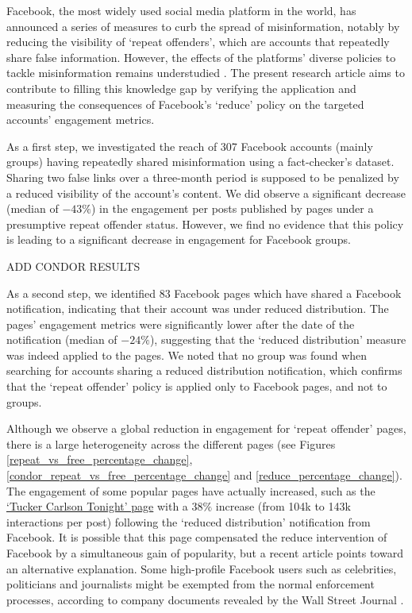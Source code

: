 \documentclass[review]{elsarticle}
\begin{document}
{Facebook, the most widely used social media platform in the world, has announced a series of measures to curb the spread of misinformation, notably by reducing the visibility of `repeat offenders', which are accounts that repeatedly share false information. 
However, the effects of the platforms' diverse policies to tackle misinformation remains understudied \citep{pasquetto2020tackling}. 
The present research article aims to contribute to filling this knowledge gap by verifying the application and measuring the consequences of Facebook's `reduce' policy on the targeted accounts' engagement metrics.

As a first step, we investigated the reach of 307 Facebook accounts (mainly groups) having repeatedly shared misinformation using a fact-checker's dataset. 
Sharing two false links over a three-month period is supposed to be penalized by a reduced visibility of the account's content. 
We did observe a significant decrease (median of $-43\%$) in the engagement per posts published by pages under a presumptive repeat offender status.
However, we find no evidence that this policy is leading to a significant decrease in engagement for Facebook groups.

{\color{red} ADD CONDOR RESULTS}
 
As a second step, we identified 83 Facebook pages which have shared a Facebook notification, indicating that their account was under reduced distribution.
The pages' engagement metrics were significantly lower after the date of the notification (median of $-24\%$), suggesting that the `reduced distribution' measure was indeed applied to the pages.
We noted that no group was found when searching for accounts sharing a reduced distribution notification, which confirms that the `repeat offender' policy is applied only to Facebook pages, and not to groups.

Although we observe a global reduction in engagement for `repeat offender' pages, there is a large heterogeneity across the different pages (see Figures \ref{repeat_vs_free_percentage_change}, \ref{condor_repeat_vs_free_percentage_change} and \ref{reduce_percentage_change}). 
The engagement of some popular pages have actually increased, such as the \href{https://www.facebook.com/TuckerCarlsonTonight/}{`Tucker Carlson Tonight' page} with a $38\%$ increase (from 104k to 143k interactions per post)  following the `reduced distribution' notification from Facebook. 
It is possible that this page compensated the reduce intervention of Facebook by a simultaneous gain of popularity, but a recent article points toward an alternative explanation. 
Some high-profile Facebook users such as celebrities, politicians and journalists might be exempted from the normal enforcement processes, according to company documents revealed by the Wall Street Journal \citep{WSJrevelations}.

}
\end{document}
